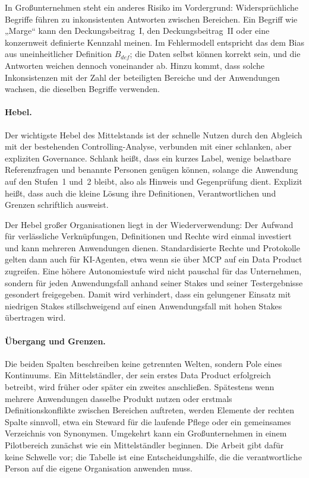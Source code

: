 \documentclass[a4paper,12pt]{article}
\theoremstyle{definition}
\begin{document}
In Großunternehmen steht ein anderes Risiko im Vordergrund: Widersprüchliche Begriffe führen zu inkonsistenten Antworten zwischen Bereichen. Ein Begriff wie „Marge“ kann den Deckungsbeitrag~I, den Deckungsbeitrag~II oder eine konzernweit definierte Kennzahl meinen. Im Fehlermodell entspricht das dem Bias aus uneinheitlicher Definition $B_{def}$; die Daten selbst können korrekt sein, und die Antworten weichen dennoch voneinander ab. Hinzu kommt, dass solche Inkonsistenzen mit der Zahl der beteiligten Bereiche und der Anwendungen wachsen, die dieselben Begriffe verwenden.

\paragraph{Hebel.}
Der wichtigste Hebel des Mittelstands ist der schnelle Nutzen durch den Abgleich mit der bestehenden Controlling-Analyse, verbunden mit einer schlanken, aber expliziten Governance. Schlank heißt, dass ein kurzes Label, wenige belastbare Referenzfragen und benannte Personen genügen können, solange die Anwendung auf den Stufen~1 und~2 bleibt, also als Hinweis und Gegenprüfung dient. Explizit heißt, dass auch die kleine Lösung ihre Definitionen, Verantwortlichen und Grenzen schriftlich ausweist.

Der Hebel großer Organisationen liegt in der Wiederverwendung: Der Aufwand für verlässliche Verknüpfungen, Definitionen und Rechte wird einmal investiert und kann mehreren Anwendungen dienen. Standardisierte Rechte und Protokolle gelten dann auch für KI-Agenten, etwa wenn sie über MCP auf ein Data Product zugreifen. Eine höhere Autonomiestufe wird nicht pauschal für das Unternehmen, sondern für jeden Anwendungsfall anhand seiner Stakes und seiner Testergebnisse gesondert freigegeben. Damit wird verhindert, dass ein gelungener Einsatz mit niedrigen Stakes stillschweigend auf einen Anwendungsfall mit hohen Stakes übertragen wird.

\paragraph{Übergang und Grenzen.}
Die beiden Spalten beschreiben keine getrennten Welten, sondern Pole eines Kontinuums. Ein Mittelständler, der sein erstes Data Product erfolgreich betreibt, wird früher oder später ein zweites anschließen. Spätestens wenn mehrere Anwendungen dasselbe Produkt nutzen oder erstmals Definitionskonflikte zwischen Bereichen auftreten, werden Elemente der rechten Spalte sinnvoll, etwa ein Steward für die laufende Pflege oder ein gemeinsames Verzeichnis von Synonymen. Umgekehrt kann ein Großunternehmen in einem Pilotbereich zunächst wie ein Mittelständler beginnen. Die Arbeit gibt dafür keine Schwelle vor; die Tabelle ist eine Entscheidungshilfe, die die verantwortliche Person auf die eigene Organisation anwenden muss.
\end{document}
